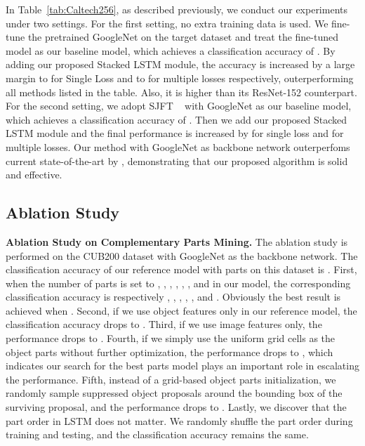 \documentclass[10pt,twocolumn,letterpaper]{article}
\begin{document}
In Table~\ref{tab:Caltech256}, as described previously, we conduct our experiments under two settings. For the first setting, no extra training data is used. We fine-tune the pretrained GoogleNet on the target dataset and treat the fine-tuned model as our baseline model, which achieves a classification accuracy of . By adding our proposed Stacked LSTM module, the accuracy is increased by a large margin to  for Single Loss and to  for multiple losses respectively, outerperforming all methods listed in the table. Also, it is  higher than its ResNet-152 counterpart. For the second setting, we adopt SJFT ~\cite{GeYu17} with GoogleNet as our baseline model, which achieves a classification accuracy of . Then we add our proposed Stacked LSTM module and the final performance is increased by  for single loss and  for multiple losses. Our method with GoogleNet as backbone network outerperfoms current state-of-the-art by , demonstrating that our proposed algorithm is solid and effective.


\subsection{Ablation Study}
\textbf{Ablation Study on Complementary Parts Mining.} The ablation study is performed on the CUB200 dataset with GoogleNet as the backbone network. The classification accuracy of our reference model with  parts on this dataset is . First, when the number of parts  is set to , , , , , , and  in our model, the corresponding classification accuracy is respectively , , , , ,  and .
Obviously the best result is achieved when .
Second, if we use object features only in our reference model, the classification accuracy drops to . Third, if we use image features only, the performance drops to .
Fourth, if we simply use the uniform grid cells as the object parts without further optimization, the performance drops to , which indicates our search for the best parts model plays an important role in escalating the performance.
Fifth, instead of a grid-based object parts initialization, we randomly sample  suppressed object proposals around the bounding box of the surviving proposal, and the performance drops to . Lastly, we discover that the part order in LSTM does not matter. We randomly shuffle the part order during training and testing, and the classification accuracy remains the same.
\end{document}
